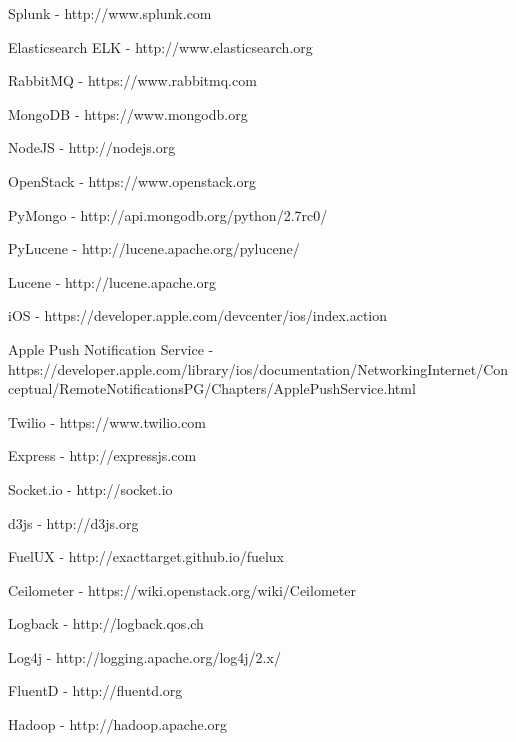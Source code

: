 \documentclass[10pt, a4paper, conference, compsocconf]{IEEEtran}
\begin{document}
%
%
%
\begin{thebibliography}{1}

    Splunk - http://www.splunk.com

    Elasticsearch ELK - http://www.elasticsearch.org

    RabbitMQ - https://www.rabbitmq.com

    MongoDB - https://www.mongodb.org

    NodeJS - http://nodejs.org

    OpenStack - https://www.openstack.org

    PyMongo - http://api.mongodb.org/python/2.7rc0/

    PyLucene - http://lucene.apache.org/pylucene/

    Lucene - http://lucene.apache.org

    iOS - https://developer.apple.com/devcenter/ios/index.action

    Apple Push Notification Service - https://developer.apple.com/library/ios/documentation/NetworkingInternet/Conceptual/RemoteNotificationsPG/Chapters/ApplePushService.html

    Twilio - https://www.twilio.com

    Express - http://expressjs.com

    Socket.io - http://socket.io

    d3js - http://d3js.org

    FuelUX - http://exacttarget.github.io/fuelux

    Ceilometer - https://wiki.openstack.org/wiki/Ceilometer

    Logback - http://logback.qos.ch

    Log4j - http://logging.apache.org/log4j/2.x/

    FluentD - http://fluentd.org

    Hadoop - http://hadoop.apache.org

\end{thebibliography}

\end{document}
